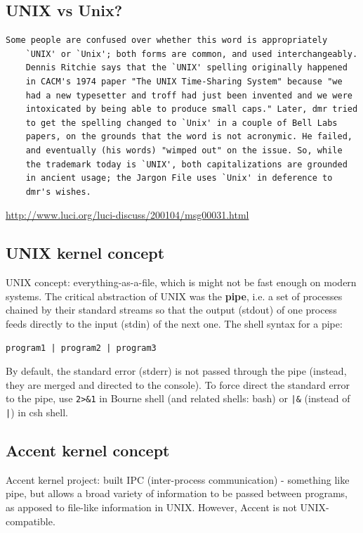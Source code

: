 \subsection{UNIX vs Unix?}

{\small
\begin{verbatim}
Some people are confused over whether this word is appropriately
    `UNIX' or `Unix'; both forms are common, and used interchangeably.
    Dennis Ritchie says that the `UNIX' spelling originally happened
    in CACM's 1974 paper "The UNIX Time-Sharing System" because "we
    had a new typesetter and troff had just been invented and we were
    intoxicated by being able to produce small caps." Later, dmr tried
    to get the spelling changed to `Unix' in a couple of Bell Labs
    papers, on the grounds that the word is not acronymic. He failed,
    and eventually (his words) "wimped out" on the issue. So, while
    the trademark today is `UNIX', both capitalizations are grounded
    in ancient usage; the Jargon File uses `Unix' in deference to
    dmr's wishes.
\end{verbatim}
}

\url{http://www.luci.org/luci-discuss/200104/msg00031.html}


\subsection{UNIX kernel concept}


UNIX concept: everything-as-a-file, which is might not be fast enough on modern
systems.
The critical abstraction of UNIX was the {\bf pipe}, i.e. a set of processes
chained by their standard streams so that the output (stdout) of one process
feeds directly to the input (stdin) of the next one. The shell syntax for a
pipe:
\begin{verbatim}
program1 | program2 | program3
\end{verbatim} 
By default, the standard error (stderr) is not passed through the pipe (instead, they are merged 
and directed to the console). To force direct the standard error to the pipe, use
\verb!2>&1! in Bourne shell (and related shells: bash) or \verb!|&! (instead of \verb!|!) in csh shell.

\subsection{Accent kernel concept}
\label{sec:Accent-kernel_concept}

Accent kernel project: built IPC (inter-process communication) - something like
pipe, but allows a broad variety of information to be passed between programs,
as apposed to file-like information in UNIX.
However, Accent is not UNIX-compatible.



